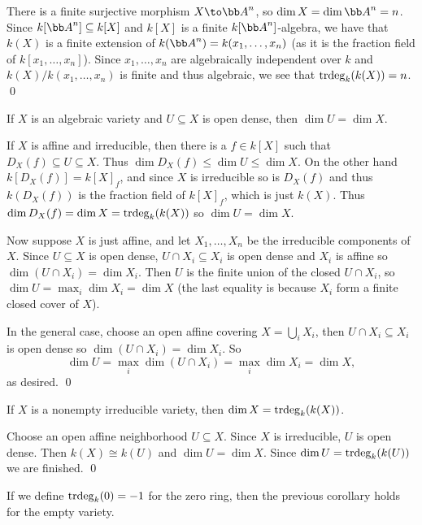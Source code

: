     There is a finite surjective morphism $X\to\bA^n$, so $\dim X=\dim\bA^n=n$.
    Since $k[\bA^n]\subseteq k[X]$ and $k[X]$ is a finite $k[\bA^n]$-algebra, we have that $k(X)$ is a finite extension of $k(\bA^n)=k(x_1,\dots,x_n)$
    (as it is the fraction field of $k[x_1,\dots,x_n]$).
    Since $x_1,\dots,x_n$ are algebraically independent over $k$ and $k(X)/k(x_1,\dots,x_n)$ is finite and thus algebraic, we see that ${\mathop{\rm trdeg}}_k(k(X))=n$.
    \qed

\eproof

\bcoro

    If $X$ is an algebraic variety and $U\subseteq X$ is open dense, then $\dim U=\dim X$.

\ecoro

\bproof

    If $X$ is affine and irreducible, then there is a $f\in k[X]$ such that $D_X(f)\subseteq U\subseteq X$.
    Thus $\dim D_X(f)\leq\dim U\leq\dim X$.
    On the other hand $k[D_X(f)] = k[X]_f$, and since $X$ is irreducible so is $D_X(f)$ and thus $k(D_X(f))$ is the fraction field of $k[X]_f$,
    which is just $k(X)$.
    Thus $\dim D_X(f)=\dim X={\mathop{\rm trdeg}}_k(k(X))$ so $\dim U=\dim X$.

    Now suppose $X$ is just affine, and let $X_1,\dots,X_n$ be the irreducible components of $X$.
    Since $U\subseteq X$ is open dense, $U\cap X_i\subseteq X_i$ is open dense and $X_i$ is affine so $\dim(U\cap X_i)=\dim X_i$.
    Then $U$ is the finite union of the closed $U\cap X_i$, so $\dim U=\max_i\dim X_i=\dim X$ (the last equality is because $X_i$ form a finite closed cover of $X$).

    In the general case, choose an open affine covering $X=\bigcup_iX_i$, then $U\cap X_i\subseteq X_i$ is open dense so $\dim(U\cap X_i)=\dim X_i$.
    So
    $$ \dim U = \max_i\dim(U\cap X_i) = \max_i\dim X_i = \dim X , $$
    as desired.
    \qed

\eproof

\bcoro

    If $X$ is a nonempty irreducible variety, then $\dim X={\mathop{\rm trdeg}}_k(k(X))$.

\ecoro

\bproof

    Choose an open affine neighborhood $U\subseteq X$.
    Since $X$ is irreducible, $U$ is open dense.
    Then $k(X)\cong k(U)$ and $\dim U=\dim X$.
    Since $\dim U={\mathop{\rm trdeg}}_k(k(U))$ we are finished.
    \qed

\eproof

If we define ${\mathop{\rm trdeg}}_k(0)=-1$ for the zero ring, then the previous corollary holds for the empty variety.


